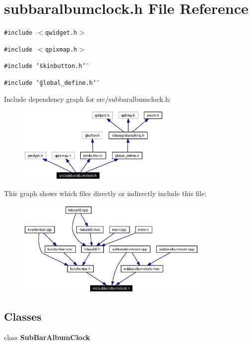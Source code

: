 \section{subbaralbumclock.h File Reference}
\label{src_2subbaralbumclock_8h}


{\tt \#include $<$qwidget.h$>$}\par
{\tt \#include $<$qpixmap.h$>$}\par
{\tt \#include \char`\"{}skinbutton.h\char`\"{}}\par
{\tt \#include \char`\"{}global\_\-define.h\char`\"{}}\par


Include dependency graph for src/subbaralbumclock.h:\begin{figure}[H]
\begin{center}
\leavevmode
\includegraphics[width=211pt]{src_2subbaralbumclock_8h__incl}
\end{center}
\end{figure}


This graph shows which files directly or indirectly include this file:\begin{figure}[H]
\begin{center}
\leavevmode
\includegraphics[width=264pt]{src_2subbaralbumclock_8h__dep__incl}
\end{center}
\end{figure}
\subsection*{Classes}
\begin{CompactItemize}
\item 
class {\bf Sub\-Bar\-Album\-Clock}
\end{CompactItemize}

